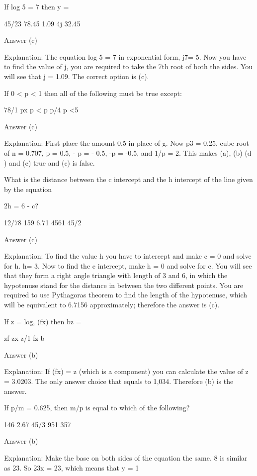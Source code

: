 
If log 5 = 7 then y =

    45/23
    78.45
    1.09
    4j
    32.45 

Answer (c)

Explanation: The equation log 5 = 7 in exponential form, j7= 5. Now you have to find the value of j, you are required to take the 7th root of both the sides. You will see that j = 1.09. The correct option is (c).

If 0 < p < 1 then all of the following must be true except:

    78/1
    px
    p < p
    p/4
    p <5 

Answer (c)

Explanation: First place the amount 0.5 in place of g. Now p3 = 0.25, cube root of n = 0.707, p = 0.5, - p = - 0.5, -p = -0.5, and 1/p = 2. This makes (a), (b) (d ) and (e) true and (c) is false.

What is the distance between the c intercept and the h intercept of the line given by the equation

2h = 6 - c?

    12/78
    159
    6.71
    4561
    45/2 

Answer (c)

Explanation: To find the value h you have to intercept and make c = 0 and solve for h. h= 3. Now to find the c intercept, make h = 0 and solve for c. You will see that they form a right angle triangle with length of 3 and 6, in which the hypotenuse stand for the distance in between the two different points. You are required to use  Pythagoras theorem to find the length of the hypotenuse, which will be equivalent to 6.7156 approximately; therefore the answer is (c).

If z = log, (fx) then bz =

    zf
    zx
    z/1
    fz
    b 

Answer (b)

Explanation: If (fx) = z (which is a component) you can calculate the value of z = 3.0203. The only answer choice that equals to 1,034. Therefore (b) is the answer.

If p/m = 0.625, then m/p is equal to which of the following?

    146
    2.67
    45/3
    951
    357 

Answer (b)

Explanation: Make the base on both sides of the equation the same. 8 is similar as 23. So 23x  = 23, which means that y = 1

